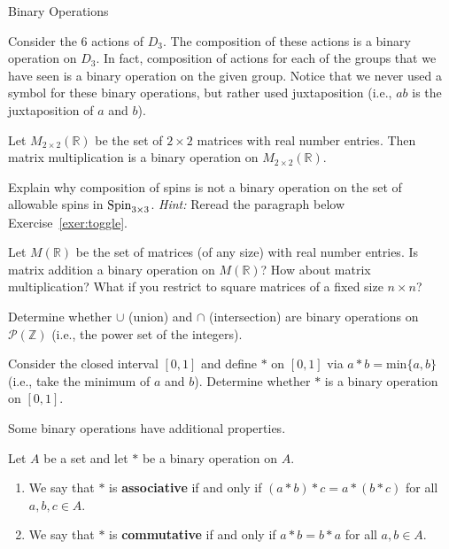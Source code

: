 \begin{section}{Binary Operations}
\begin{example}
Consider the 6 actions of $D_3$.  The composition of these actions is a binary operation on $D_3$.  In fact, composition of actions for each of the groups that we have seen is a binary operation on the given group.  Notice that we never used a symbol for these binary operations, but rather used juxtaposition (i.e., $ab$ is the juxtaposition of $a$ and $b$).
\end{example}

\begin{example}
Let $M_{2\times 2}(\mathbb{R})$ be the set of $2\times 2$ matrices with real number entries.  Then matrix multiplication is a binary operation on $M_{2\times 2}(\mathbb{R})$.
\end{example}

\begin{exercise}
Explain why composition of spins is not a binary operation on the set of allowable spins in $\operatorname{Spin}_{3\times 3}$. \emph{Hint:} Reread the paragraph below Exercise~\ref{exer:toggle}.
\end{exercise}

\begin{exercise}
Let $M(\mathbb{R})$ be the set of matrices (of any size) with real number entries.  Is matrix addition a binary operation on $M(\mathbb{R})$?  How about matrix multiplication? What if you restrict to square matrices of a fixed size $n\times n$?
\end{exercise}

\begin{exercise}
Determine whether $\cup$ (union) and $\cap$ (intersection) are binary operations on $\mathcal{P}(\mathbb{Z})$ (i.e., the power set of the integers).
\end{exercise}

\begin{exercise}
Consider the closed interval $[0,1]$ and define $*$ on $[0,1]$ via $a*b=\mathrm{min}\{a,b\}$ (i.e., take the minimum of $a$ and $b$).  Determine whether $*$ is a binary operation on $[0,1]$.
\end{exercise}

Some binary operations have additional properties.

\begin{definition}
Let $A$ be a set and let $*$ be a binary operation on $A$.
\begin{enumerate}[label=\rm{(\alph*)}]
\item We say that $*$ is \textbf{associative} if and only if $(a*b)*c=a*(b*c)$ for all $a,b,c\in A$.
\item We say that $*$ is \textbf{commutative} if and only if $a*b=b*a$ for all $a,b\in A$.
\end{enumerate}
\end{definition}


\end{section}
